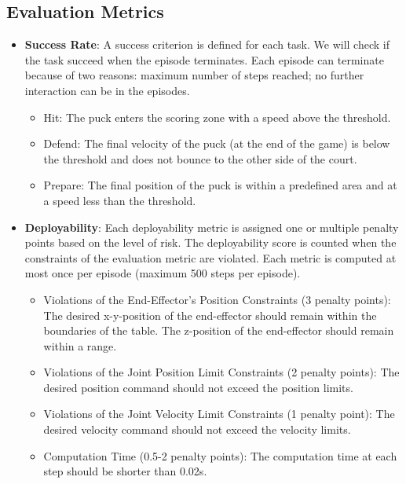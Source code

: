 \subsection{Evaluation Metrics}
    \begin{itemize}
        \item \textbf{Success Rate}:
        A success criterion is defined for each task. We will check if the task succeed when the episode terminates. Each episode can terminate because of two reasons: maximum number of steps reached; no further interaction can be in the episodes.
        \begin{itemize}
            \item Hit: The puck enters the scoring zone with a speed above the threshold.
            \item Defend: The final velocity of the puck (at the end of the game) is below the threshold and does not bounce to the other side of the court.
            \item Prepare: The final position of the puck is within a predefined area and at a speed less than the threshold.
        \end{itemize}

        \item \textbf{Deployability}: Each deployability metric is assigned one or multiple penalty points based on the level of risk. The deployability score is counted when the constraints of the evaluation metric are violated. Each metric is computed at most once per episode (maximum 500 steps per episode). 
        \begin{itemize}
            \item Violations of the End-Effector's Position Constraints (3 penalty points): 
            The desired x-y-position of the end-effector should remain within the boundaries of the table. The z-position of the end-effector should remain within a range.
            \item Violations of the Joint Position Limit Constraints (2 penalty points): The desired position command should not exceed the position limits.
            \item Violations of the Joint Velocity Limit Constraints (1 penalty point): The desired velocity command should not exceed the velocity limits.
            \item Computation Time (0.5-2 penalty points): The computation time at each step should be shorter than 0.02s.
        \end{itemize}
    \end{itemize}

